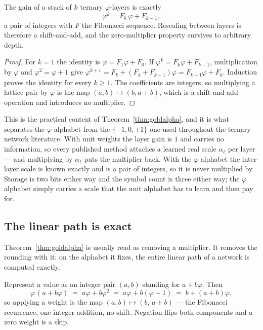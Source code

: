 \begin{corollary}
\label{cor:depth}
The gain of a stack of $k$ ternary $\varphi$-layers is exactly
\[
  \varphi^{k} = F_k\,\varphi + F_{k-1},
\]
a pair of integers with $F$ the Fibonacci sequence. Rescaling between layers is
therefore a shift-and-add, and the zero-multiplier property survives to arbitrary
depth.
\end{corollary}
\begin{proof}
For $k=1$ the identity is $\varphi=F_1\varphi+F_0$. If
$\varphi^k=F_k\varphi+F_{k-1}$, multiplication by $\varphi$ and
$\varphi^2=\varphi+1$ give
$\varphi^{k+1}=F_k+ (F_k+F_{k-1})\varphi
=F_{k+1}\varphi+F_k$.
Induction proves the identity for every $k\geq1$. The coefficients are integers,
so multiplying a lattice pair by $\varphi$ is the map $(a,b)\mapsto(b,a+b)$,
which is a shift-and-add operation and introduces no multiplier.
\end{proof}

This is the practical content of Theorem~\ref{thm:goldalpha}, and it is what
separates the $\varphi$ alphabet from the $\{-1,0,+1\}$ one used throughout the
ternary-network literature. With unit weights the layer gain is $1$ and carries no
information, so every published method attaches a learned real scale $\alpha_\ell$
per layer --- and multiplying by $\alpha_\ell$ puts the multiplier back. With the
$\varphi$ alphabet the inter-layer scale is known exactly and is a pair of
integers, so it is never multiplied by. Storage is two bits either way and the
symbol count is three either way; the $\varphi$ alphabet simply carries a scale
that the unit alphabet has to learn and then pay for.


\subsection{The linear path is exact}

\label{sec:exact}

Theorem~\ref{thm:goldalpha} is usually read as removing a multiplier. It removes
the rounding with it: on the alphabet it fixes, the entire linear path of a
network is computed exactly.

Represent a value as an integer pair $(a,b)$ standing for $a + b\varphi$. Then
\[
  \varphi\,(a + b\varphi) \;=\; a\varphi + b\varphi^{2} \;=\; a\varphi + b(\varphi+1)
  \;=\; b + (a+b)\varphi ,
\]
so applying a weight is the map $(a,b) \mapsto (b,\,a+b)$ --- the Fibonacci
recurrence, one integer addition, no shift. Negation flips both components and a
zero weight is a skip.

